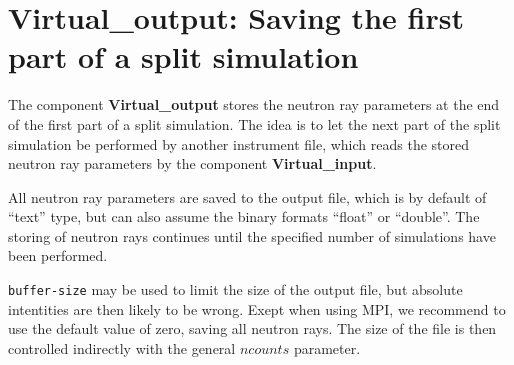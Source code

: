 \section{Virtual\_output: Saving the first part of a split simulation}
\label{virtual_output}


The component \textbf{Virtual\_output} stores the neutron ray parameters
at the end of the first part of a split simulation. The idea is to let the
next part of the split simulation be performed by another instrument file,
which reads the stored neutron ray
parameters by the component \textbf{Virtual\_input}.

All neutron ray parameters are saved to the output file, which is by default
of ``text'' type, but can also assume the binary formats
``float'' or ``double''. The storing of neutron rays continues until the
specified number of simulations have been performed.

\verb+buffer-size+ may be used to limit the size of the output file, but
absolute intentities are then likely to be wrong.
Exept when using MPI, we recommend to use the default value of zero, saving all neutron rays.
The size of the file is then controlled indirectly with the general $ncounts$ parameter.
